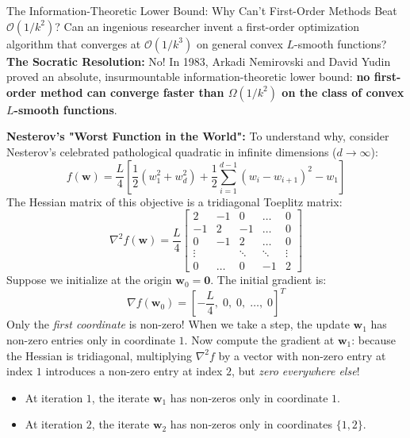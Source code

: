 \begin{ponderbox}{The Information-Theoretic Lower Bound: Why Can't First-Order Methods Beat $\mathcal{O}(1/k^2)$?}
Can an ingenious researcher invent a first-order optimization algorithm that converges at $\mathcal{O}(1/k^3)$ on general convex $L$-smooth functions?
\tcblower
\textbf{The Socratic Resolution:}
No! In 1983, Arkadi Nemirovski and David Yudin proved an absolute, insurmountable information-theoretic lower bound: \textbf{no first-order method can converge faster than $\Omega(1/k^2)$ on the class of convex $L$-smooth functions}.

\textbf{Nesterov's "Worst Function in the World":}
To understand why, consider Nesterov's celebrated pathological quadratic in infinite dimensions ($d \to \infty$):
\begin{equation*}
f(\mathbf{w}) = \frac{L}{4} \left[ \frac{1}{2}(w_1^2 + w_d^2) + \frac{1}{2}\sum_{i=1}^{d-1}(w_i - w_{i+1})^2 - w_1 \right]
\end{equation*}
The Hessian matrix of this objective is a tridiagonal Toeplitz matrix:
\begin{equation*}
\nabla^2 f(\mathbf{w}) = \frac{L}{4} \begin{bmatrix} 2 & -1 & 0 & \dots & 0 \\ -1 & 2 & -1 & \dots & 0 \\ 0 & -1 & 2 & \dots & 0 \\ \vdots & & \ddots & \ddots & \vdots \\ 0 & \dots & 0 & -1 & 2 \end{bmatrix}
\end{equation*}
Suppose we initialize at the origin $\mathbf{w}_0 = \mathbf{0}$. The initial gradient is:
\begin{equation*}
\nabla f(\mathbf{w}_0) = \left[ -\frac{L}{4}, \; 0, \; 0, \; \dots, \; 0 \right]^T
\end{equation*}
Only the \emph{first coordinate} is non-zero!
When we take a step, the update $\mathbf{w}_1$ has non-zero entries only in coordinate $1$.
Now compute the gradient at $\mathbf{w}_1$: because the Hessian is tridiagonal, multiplying $\nabla^2 f$ by a vector with non-zero entry at index $1$ introduces a non-zero entry at index $2$, but \emph{zero everywhere else}!
\begin{itemize}
    \item At iteration $1$, the iterate $\mathbf{w}_1$ has non-zeros only in coordinate $1$.
    \item At iteration $2$, the iterate $\mathbf{w}_2$ has non-zeros only in coordinates $\{1, 2\}$.

\end{itemize}
\end{ponderbox}
